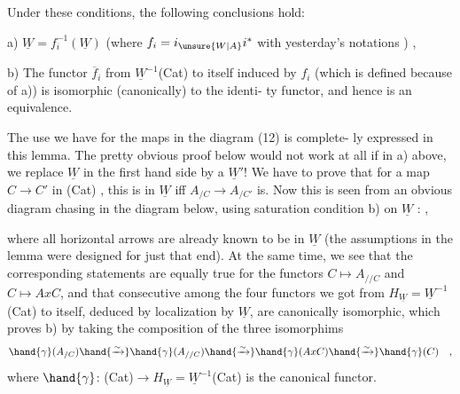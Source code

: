
Under these conditions,  the following conclusions hold:

a) $\underline{W} = f_{i}^{-1}(\underline{W})$ \quad (where $f_{i} = i_{\unsure{W|A}}i^{*}$ with yesterday's notations ) ,

b) The functor $\overline{f}_{i}$ from $\underline{W}^{-1}$(Cat) to itself induced by $f_{i}$ (which is
defined because of a)) is isomorphic (canonically) to the identi-%
ty functor, and hence is an equivalence.

The use we have for the   maps in the diagram (12) is complete-%
ly expressed in this lemma. The pretty obvious proof below would not
work at all if in a) above, we replace $\underline{W}$ in the first hand side by a $\underline{W}'$!
We have to prove that for a map $C \to C'$ in (Cat) , this is in $\underline{W}$ iff
$A_{/C} \to A_{/C'}$ is. Now this is seen from an obvious diagram chasing in the
diagram below, using saturation condition b) on $\underline{W}$ :
 ,

where all horizontal arrows are already known to be in $\underline{W}$ (the assumptions
in the lemma were designed for just that end). At the same time, we see
that the corresponding statements are equally true for the functors
$C \mapsto A_{//C}$ and $C \mapsto AxC$, and that  consecutive among the four functors
we got from $H_{\underline{W}} = \underline{W}^{-1}$(Cat) to itself, deduced by localization by $\underline{W}$,
are canonically isomorphic, which proves b) by taking the composition
of the three isomorphims
\[ \hand{\gamma}(A_{/C}) \hand{\xrightarrow{\sim}} \hand{\gamma}(A_{//C}) \hand{\xrightarrow{\sim}} \hand{\gamma}(AxC) \hand{\xrightarrow{\sim}} \hand{\gamma}(C) \quad , \]
where $\hand{\gamma}$: (Cat)$\to H_{\underline{W}} = \underline{W}^{-1}$(Cat) is the canonical functor.

